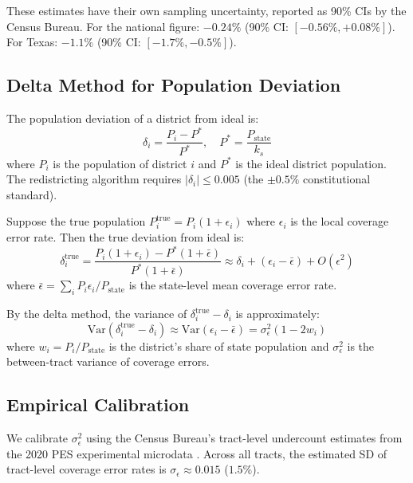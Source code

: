 These estimates have their own sampling uncertainty, reported as 90\%
CIs by the Census Bureau. For the national figure: $-0.24\%$
(90\% CI: $[-0.56\%, +0.08\%]$). For Texas: $-1.1\%$
(90\% CI: $[-1.7\%, -0.5\%]$).

\subsection{Delta Method for Population Deviation}

The population deviation of a district from ideal is:
\begin{equation}
  \delta_i = \frac{P_i - P^*}{P^*},
  \quad P^* = \frac{P_\text{state}}{k_s}
\end{equation}
where $P_i$ is the population of district $i$ and $P^* $ is the
ideal district population. The redistricting algorithm requires
$|\delta_i| \leq 0.005$ (the $\pm 0.5\%$ constitutional standard).

Suppose the true population $P_i^{\text{true}} = P_i (1 + \epsilon_i)$
where $\epsilon_i$ is the local coverage error rate. Then the true
deviation from ideal is:
\begin{equation}
  \delta_i^{\text{true}}
    = \frac{P_i(1+\epsilon_i) - P^*(1+\bar\epsilon)}{P^*(1+\bar\epsilon)}
    \approx \delta_i + (\epsilon_i - \bar\epsilon) + O(\epsilon^2)
\end{equation}
where $\bar\epsilon = \sum_i P_i \epsilon_i / P_\text{state}$ is the
state-level mean coverage error rate.

By the delta method, the variance of $\delta_i^{\text{true}} - \delta_i$
is approximately:
\begin{equation}
  \text{Var}(\delta_i^{\text{true}} - \delta_i)
    \approx \text{Var}(\epsilon_i - \bar\epsilon)
    = \sigma^2_\epsilon (1 - 2 w_i)
\end{equation}
where $w_i = P_i / P_\text{state}$ is the district's share of state
population and $\sigma^2_\epsilon$ is the between-tract variance
of coverage errors.

\subsection{Empirical Calibration}

We calibrate $\sigma^2_\epsilon$ using the Census Bureau's
tract-level undercount estimates from the 2020 PES experimental
microdata \citep{uscensusbureau2022net}. Across all tracts, the
estimated SD of tract-level coverage error rates is
$\sigma_\epsilon \approx 0.015$ ($1.5\%$).

